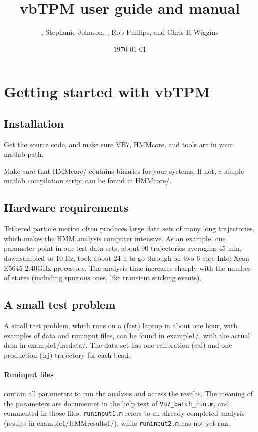 \documentclass[11pt,letterpaper,twocolumn]{article}
\title{vbTPM user guide and manual}
\author{\ml{Martin Lind\'en}, Stephanie Johnson, \jwm{Jan-Willem van
    de Meent}, Rob Phillips, and Chris H Wiggins}
\date{\today}
\begin{document}
\maketitle
\tableofcontents

\section{Getting started with vbTPM}
\subsection{Installation}
Get the source code, and make sure VB7, HMMcore, and tools are in your
matlab path.

Make sure that HMMcore/ contains binaries for your systems. If not, a
simple matlab compilation script can be found in HMMcore/.

\subsection{Hardware requirements}
Tethered particle motion often produces large data sets of many long
trajectories, which makes the HMM analysis computer intensive. As an
example, one parameter point in our test data sets, about 90
trajectories averaging 45 min, downsampled to 10 Hz, took about 24 h
to go through on two 6 core Intel Xeon E5645 2.40GHz processors. The
analysis time increases sharply with the number of states (including
spurious ones, like transient sticking events).
\subsection{A small test problem}
A small test problem, which runs on a (fast) laptop in about one hour,
with examples of data and runinput files, can be found in example1/,
with the actual data in example1/lacdata/.  The data set has one
calibration (cal) and one production (trj) trajectory for each bead.

\paragraph{Runinput files} 
contain all parameters to run the analysis and access the results. The
meaning of the parameters are documentet in the help text of
\verb+VB7_batch_run.m+, and commented in those files.
\verb+runinput1.m+ refers to an already completed analysis (results in
example1/HMMresults1/), while \verb+runinput2.m+ has not yet run.
\end{document}
